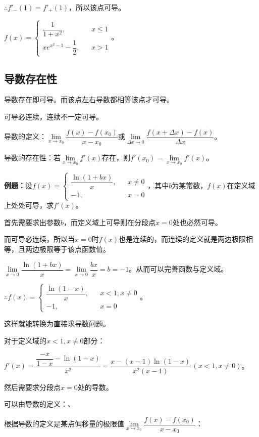 \documentclass[UTF8, 12pt]{ctexart}
\begin{document}
$\therefore f'_-(1)=f'_+(1)$，所以该点可导。\medskip

$f(x)=\left\{\begin{array}{lcl}
    \dfrac{1}{1+x^2}, & & x\leqslant 1 \\
    xe^{x^2-1}-\dfrac{1}{2}, & & x>1
\end{array}
\right.$。

\subsection{导数存在性}

导数存在即可导。而该点左右导数都相等该点才可导。

可导必连续，连续不一定可导。

导数的定义：$\lim\limits_{x\to x_0}\dfrac{f(x)-f(x_0)}{x-x_0}$或$\lim\limits_{\Delta x\to 0}\dfrac{f(x+\Delta x)-f(x)}{\Delta x}$。

导数的存在性：若$\lim\limits_{x\to x_0}f'(x)$存在，则$f'(x_0)=\lim\limits_{x\to x_0}f'(x)$。\medskip

\textbf{例题：}设$f(x)=\left\{\begin{array}{lcl}
    \dfrac{\ln(1+bx)}{x}, & & x\neq 0 \\
    -1, & & x=0
\end{array}
\right.$，其中$b$为某常数，$f(x)$在定义域上处处可导，求$f'(x)$。

首先需要求出参数$b$，而定义域上可导则在分段点$x=0$处也必然可导。

而可导必连续，所以当$x=0$时$f(x)$也是连续的，而连续的定义就是两边极限相等，且两边极限等于该点函数值。\medskip

$\lim\limits_{x\to 0}\dfrac{\ln(1+bx)}{x}=\lim\limits_{x\to 0}\dfrac{bx}{x}=b=-1$。从而可以完善函数与定义域。\medskip

$\therefore f(x)=\left\{\begin{array}{lcl}
    \dfrac{\ln(1-x)}{x}, & & x<1,x\neq 0 \\
    -1, & & x=0
\end{array}
\right.$。

这样就能转换为直接求导数问题。

对于定义域的$x<1,x\neq 0$部分：\medskip

$f'(x)=\dfrac{\dfrac{-x}{1-x}-\ln(1-x)}{x^2}=\dfrac{x-(x-1)\ln(1-x)}{x^2(x-1)}\,(x<1,x\neq 0)$。

然后需要求分段点$x=0$处的导数。

可以由导数的定义：、

根据导数的定义是某点偏移量的极限值$\lim\limits_{x\to x_0}\dfrac{f(x)-f(x_0)}{x-x_0}$：
\end{document}
